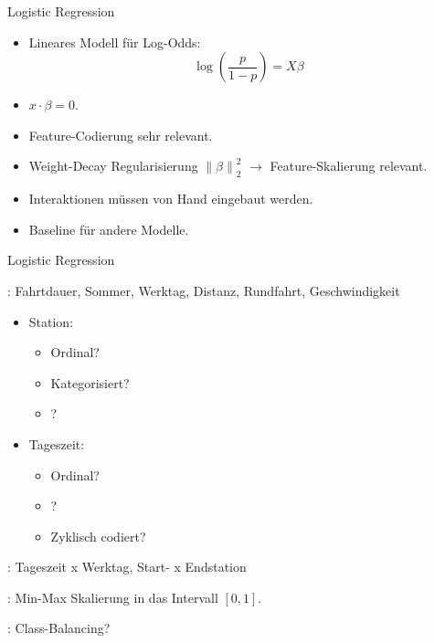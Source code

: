 \begin{frame}{Logistic Regression}
{
\begin{itemize}
\item Lineares Modell für Log-Odds:
\begin{equation}
\log(\frac{p}{1-p}) = X\beta
\end{equation}
\item {} $x \cdot \beta = 0$.
\item Feature-Codierung sehr relevant.
\item Weight-Decay Regularisierung $\left\lVert\beta\right\rVert_2^2$ $\rightarrow$ Feature-Skalierung relevant.
\item Interaktionen müssen von Hand eingebaut werden.
\item Baseline für andere Modelle.
\end{itemize}
}
\end{frame}

\begin{frame}{Logistic Regression}
{
: Fahrtdauer, Sommer, Werktag, Distanz, Rundfahrt, Geschwindigkeit
\vspace{-0.4cm}
\begin{multicols}{2}
\begin{itemize}
\item Station:
\begin{itemize}
\item Ordinal?
\item Kategorisiert?
\item {}?
\end{itemize}
\item Tageszeit:
\begin{itemize}
\item Ordinal?
\item {}?
\item Zyklisch codiert?
\end{itemize}
\end{itemize}
\end{multicols}

: Tageszeit x Werktag, Start- x Endstation

: Min-Max Skalierung in das Intervall $[0,1]$.

: Class-Balancing?
}
\end{frame}

